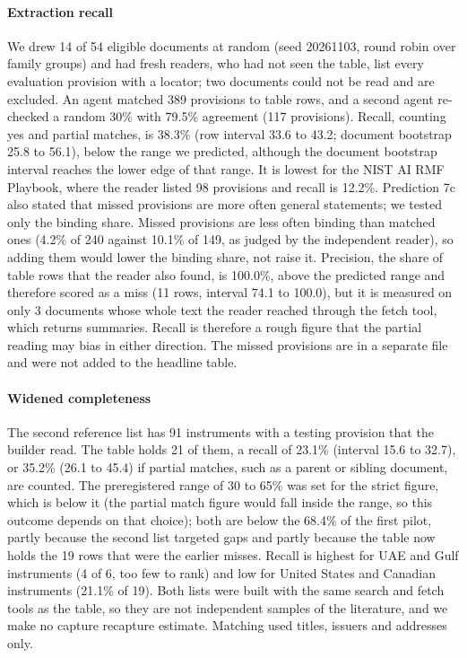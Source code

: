 \documentclass[conference]{IEEEtran}
\begin{document}
\paragraph{Extraction recall} We drew 14 of 54 eligible documents at random (seed 20261103, round robin over family groups) and had fresh readers, who had not seen the table, list every evaluation provision with a locator; two documents could not be read and are excluded. An agent matched 389 provisions to table rows, and a second agent re-checked a random 30\% with 79.5\% agreement (117 provisions). Recall, counting yes and partial matches, is 38.3\% (row interval 33.6 to 43.2; document bootstrap 25.8 to 56.1), below the range we predicted, although the document bootstrap interval reaches the lower edge of that range. It is lowest for the NIST AI RMF Playbook, where the reader listed 98 provisions and recall is 12.2\%. Prediction 7c also stated that missed provisions are more often general statements; we tested only the binding share. Missed provisions are less often binding than matched ones (4.2\% of 240 against 10.1\% of 149, as judged by the independent reader), so adding them would lower the binding share, not raise it. Precision, the share of table rows that the reader also found, is 100.0\%, above the predicted range and therefore scored as a miss (11 rows, interval 74.1 to 100.0), but it is measured on only 3 documents whose whole text the reader reached through the fetch tool, which returns summaries. Recall is therefore a rough figure that the partial reading may bias in either direction. The missed provisions are in a separate file and were not added to the headline table.

\paragraph{Widened completeness} The second reference list has 91 instruments with a testing provision that the builder read. The table holds 21 of them, a recall of 23.1\% (interval 15.6 to 32.7), or 35.2\% (26.1 to 45.4) if partial matches, such as a parent or sibling document, are counted. The preregistered range of 30 to 65\% was set for the strict figure, which is below it (the partial match figure would fall inside the range, so this outcome depends on that choice); both are below the 68.4\% of the first pilot, partly because the second list targeted gaps and partly because the table now holds the 19 rows that were the earlier misses. Recall is highest for UAE and Gulf instruments (4 of 6, too few to rank) and low for United States and Canadian instruments (21.1\% of 19). Both lists were built with the same search and fetch tools as the table, so they are not independent samples of the literature, and we make no capture recapture estimate. Matching used titles, issuers and addresses only.
\end{document}
